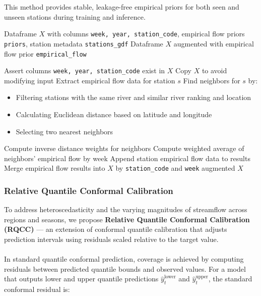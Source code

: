 \documentclass[a4paper,12pt]{article}
\begin{document}
\noindent This method provides stable, leakage-free empirical priors for both seen and unseen stations during training and inference.

\bigskip

\begin{algorithm}[H]
\caption{Empirical Flow Feature Extraction}
\begin{algorithmic}[1]
\Require Dataframe $X$ with columns \texttt{week, year, station\_code}, empirical flow priors \texttt{priors}, station metadata \texttt{stations\_gdf}
\Ensure Dataframe $X$ augmented with empirical flow prior \texttt{empirical\_flow}

\State Assert columns \texttt{week, year, station\_code} exist in $X$
\State Copy $X$ to avoid modifying input
        \State Extract empirical flow data for station $s$
    \Else
        \State Find neighbors for $s$ by:
        \begin{itemize}
            \item Filtering stations with the same river and similar river ranking and location
            \item Calculating Euclidean distance based on latitude and longitude
            \item Selecting two nearest neighbors
        \end{itemize}
        \State Compute inverse distance weights for neighbors
        \State Compute weighted average of neighbors' empirical flow by week
    \EndIf
    \State Append station empirical flow data to results
\EndFor
\State Merge empirical flow results into $X$ by \texttt{station\_code} and \texttt{week}
\State \Return augmented $X$
\end{algorithmic}
\end{algorithm}

\subsubsection{Relative Quantile Conformal Calibration} 
To address heteroscedasticity and the varying magnitudes of streamflow across regions and seasons, 
we propose \textbf{Relative Quantile Conformal Calibration (RQCC)} — an extension of conformal quantile 
calibration that adjusts prediction intervals using residuals scaled relative to the target value.
\\ \\ 
In standard quantile conformal prediction, coverage is achieved by computing residuals between predicted 
quantile bounds and observed values. For a model that outputs lower and upper quantile predictions 
$\hat{y}_t^{\text{lower}}$ and $\hat{y}_t^{\text{upper}}$, the standard conformal residual is:
\end{document}
